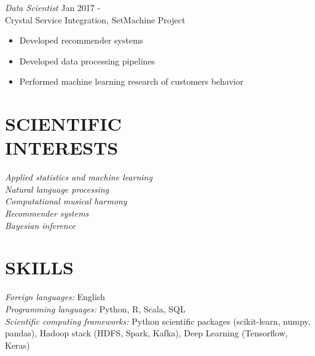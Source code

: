 \documentclass[margin, 11pt]{res} %
\begin{document}
\begin{resume}
{\sl Data Scientist} \hfill Jan 2017 - \\
Crystal Service Integration, SetMachine Project
\begin{itemize} 
\item Developed recommender systems
\item Developed data processing pipelines
\item Performed machine learning research of customers behavior
\end{itemize} 


\section{SCIENTIFIC \\ INTERESTS}

\sl Applied statistics and machine learning \\
\sl Natural language processing \\
\sl Computational musical harmony \\
\sl Recommender systems \\
\sl Bayesian inference \\

\section{SKILLS} 
{\sl Foreign languages:}
English \\
{\sl Programming languages:} 
Python, R, Scala, SQL \\
{\sl Scientific computing frameworks:}
Python scientific packages (scikit-learn, numpy, pandas), Hadoop stack (HDFS, Spark, Kafka), Deep Learning (Tensorflow, Keras)


\end{resume}
\end{document}
